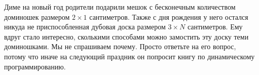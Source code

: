 Диме на новый год родители подарили мешок с бесконечным количеством доминошек размером $2 \times 1$ сантиметров. Также с дня рождения у него остался никуда не приспособленная дубовая доска размером $3 \times N$ сантиметров. Ему вдруг стало интересно, сколькими способами можно замостить эту доску теми доминошками. Мы не спрашиваем почему. Просто ответьте на его вопрос, потому что иначе на следующий праздник он попросит книгу по динамическому программированию.